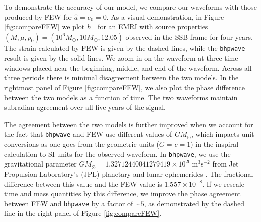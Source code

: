 \documentclass[%
 reprint,
 nofootinbib,
 amsmath,amssymb,
 aps,
 prd,
]{revtex4-2}
\begin{document}
To demonstrate the accuracy of our model, we compare our waveforms with those produced by FEW for $\hat{a} = e_0 = 0$. As a visual demonstration, in Figure \ref{fig:compareFEW} we plot $h_+$ for an EMRI with source properties $(M, \mu, p_0) = (10^6 M_\odot, 10 M_\odot, 12.05)$ observed in the SSB frame for four years. The strain calculated by FEW is given by the dashed lines, while the \texttt{bhpwave} result is given by the solid lines. We zoom in on the waveform at three time windows placed near the beginning, middle, and end of the waveform. Across all three periods there is minimal disagreement between the two models. In the rightmost panel of Figure \ref{fig:compareFEW}, we also plot the phase difference between the two models as a function of time. The two waveforms maintain subradian agreement over all five years of the signal. 

The agreement between the two models is further improved when we account for the fact that \texttt{bhpwave} and FEW use different values of $G M_\odot$, which impacts unit conversions as one goes from the geometric units ($G=c=1$) in the inspiral calculation to SI units for the observed waveform. In \texttt{bhpwave}, we use the gravitational parameter $G M_\odot = 1.32712440041279419 \times 10^{20}\, \mathrm{m}^3 \mathrm{s}^{-2}$ from Jet Propulsion Laboratory's (JPL) planetary and lunar ephemerides \cite{ParkETC21}. The fractional difference between this value and the FEW value is $1.557\times 10^{-8}$. If we rescale time and mass quantities by this difference, we improve the phase agreement between FEW and \texttt{bhpwave} by a factor of $\sim 5$, as demonstrated by the dashed line in the right panel of Figure \ref{fig:compareFEW}.
\end{document}
